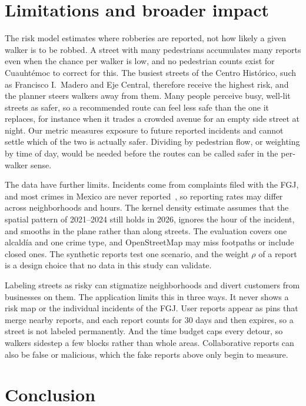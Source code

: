 \documentclass{article}
\begin{document}
\section{Limitations and broader impact}
\label{sec:limitations}

The risk model estimates where robberies are reported, not how likely a given walker is to be
robbed. A street with many pedestrians accumulates many reports even when the chance per walker is
low, and no pedestrian counts exist for Cuauhtémoc to correct for this. The busiest streets of the
Centro Histórico, such as Francisco I.\ Madero and Eje Central, therefore receive the highest risk,
and the planner steers walkers away from them. Many people perceive busy, well-lit streets as safer,
so a recommended route can feel less safe than the one it replaces, for instance when it trades a
crowded avenue for an empty side street at night. Our metric measures exposure to future reported
incidents and cannot settle which of the two is actually safer. Dividing by pedestrian flow, or
weighting by time of day, would be needed before the routes can be called safer in the per-walker
sense.

The data have further limits. Incidents come from complaints filed with the FGJ,
and most crimes in Mexico are never reported~\cite{inegi2025envipe}, so reporting rates may differ
across neighborhoods and hours. The kernel density estimate assumes that the spatial pattern of
2021--2024 still holds in 2026, ignores the hour of the incident, and smooths in the plane rather
than along streets. The evaluation covers one alcaldía and one crime type, and OpenStreetMap may
miss footpaths or include closed ones. The synthetic reports test one scenario, and the weight
$\rho$ of a report is a design choice that no data in this study can validate.

Labeling streets as risky can stigmatize neighborhoods and divert customers from businesses on
them. The application limits this in three ways. It never shows a risk map or the
individual incidents of the FGJ. User reports appear as pins that merge nearby reports, and each
report counts for 30 days and then expires, so a street is not labeled permanently. And the time budget
caps every detour, so walkers sidestep a few blocks rather than whole areas. Collaborative reports
can also be false or malicious, which the fake reports above only begin to measure. 

\section{Conclusion}
\end{document}
